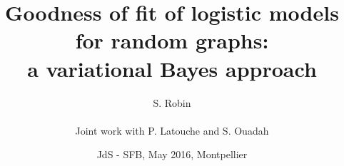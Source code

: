 \documentclass[10pt]{beamer}
\newcommand{\fignet}{../FIGURES}
\begin{document}

\title[GOF for graph models]{Goodness of fit of logistic models for random graphs: \\
a variational Bayes approach}

\author[S. Robin]{S. Robin \\ ~\\
  Joint work with P. Latouche and S. Ouadah}


\date[May 2016, Montpellier]{JdS - SFB, May 2016, Montpellier}

\maketitle

\end{document}
